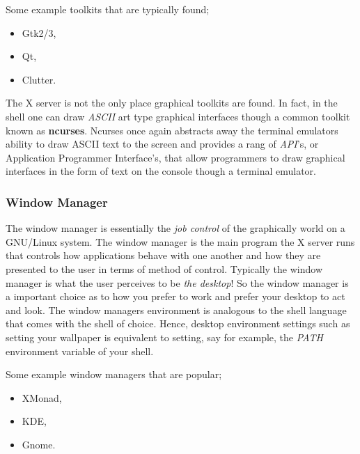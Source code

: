 \begin{exmp}
	Some example toolkits that are typically found;
	\begin{itemize}
		\item Gtk2/3,
		\item Qt,
		\item Clutter.
	\end{itemize}
\end{exmp}

The X server is not the only place graphical toolkits are found. In fact, in the shell
one can draw \emph{ASCII} art type graphical interfaces though a common toolkit known
as \textbf{ncurses}. Ncurses once again abstracts away the terminal emulators ability
to draw ASCII text to the screen and provides a rang of \emph{API}'s, or
Application Programmer Interface's, that allow programmers to draw graphical interfaces
in the form of text on the console though a terminal emulator.

\subsubsection{Window Manager}

The window manager is essentially the \emph{job control} of the graphically world on
a GNU/Linux system. The window manager is the main program the X server runs that
controls how applications behave with one another and how they are presented to the
user in terms of method of control. Typically the window manager is what the user
perceives to be \emph{the desktop}! So the window manager is a important choice
as to how you prefer to work and prefer your desktop to act and look. The window
managers environment is analogous to the shell language that comes with the shell
of choice. Hence, desktop environment settings such as setting your wallpaper is
equivalent to setting, say for example, the \emph{PATH} environment variable of
your shell.

\begin{exmp}
	Some example window managers that are popular;
	\begin{itemize}
		\item XMonad,
		\item KDE,
		\item Gnome.
	\end{itemize}
\end{exmp}


